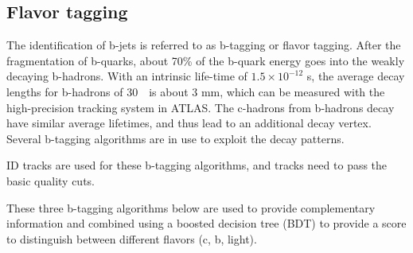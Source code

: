 \subsection{Flavor tagging}
\label{sec:track}

\par The identification of b-jets is referred to as b-tagging or flavor tagging. After the fragmentation of b-quarks, about 70\% of the b-quark energy goes into the weakly decaying b-hadrons. With an intrinsic life-time of $1.5 \times 10^{−12}$ s, the average decay lengths for b-hadrons of 30~\GeV~is about 3 mm, which can be measured with the high-precision tracking system in ATLAS.
The c-hadrons from b-hadrons decay have similar average lifetimes, and thus lead to an additional decay vertex. 
Several b-tagging algorithms are in use to exploit the decay patterns. 				
\par ID tracks are used for these b-tagging algorithms, and tracks need to pass the basic quality cuts. 		
\par These three b-tagging algorithms below are used to provide complementary information and combined using a boosted decision tree (BDT) to provide a score to distinguish between different flavors (c, b, light). 	

